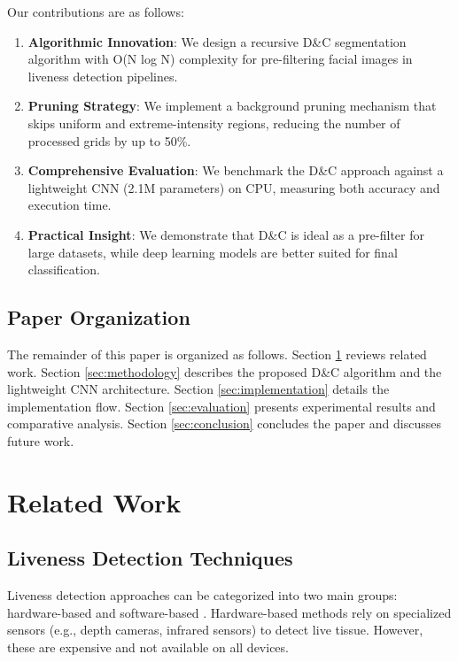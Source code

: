 \documentclass[conference]{IEEEtran}
\begin{document}
Our contributions are as follows:
\begin{enumerate}
    \item \textbf{Algorithmic Innovation}: We design a recursive D\&C segmentation algorithm with O(N log N) complexity for pre-filtering facial images in liveness detection pipelines.
    \item \textbf{Pruning Strategy}: We implement a background pruning mechanism that skips uniform and extreme-intensity regions, reducing the number of processed grids by up to 50\%.
    \item \textbf{Comprehensive Evaluation}: We benchmark the D\&C approach against a lightweight CNN (2.1M parameters) on CPU, measuring both accuracy and execution time.
    \item \textbf{Practical Insight}: We demonstrate that D\&C is ideal as a pre-filter for large datasets, while deep learning models are better suited for final classification.
\end{enumerate}

\subsection{Paper Organization}

The remainder of this paper is organized as follows. Section \ref{sec:related} reviews related work. Section \ref{sec:methodology} describes the proposed D\&C algorithm and the lightweight CNN architecture. Section \ref{sec:implementation} details the implementation flow. Section \ref{sec:evaluation} presents experimental results and comparative analysis. Section \ref{sec:conclusion} concludes the paper and discusses future work.

\section{Related Work}
\label{sec:related}

\subsection{Liveness Detection Techniques}

Liveness detection approaches can be categorized into two main groups: hardware-based and software-based \cite{galbally2014}. Hardware-based methods rely on specialized sensors (e.g., depth cameras, infrared sensors) to detect live tissue. However, these are expensive and not available on all devices.
\end{document}

